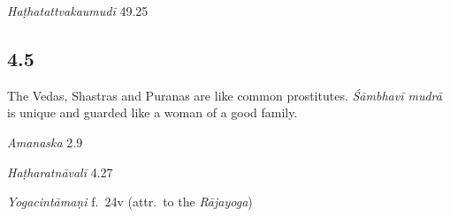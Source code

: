 \begin{ekdosis}
\begin{testimonia}[hp04_004]
\emph{Haṭhatattvakaumudī} 49.25
\begin{versinnote}
\end{versinnote}
\end{testimonia}


\subsection*{4.5}
\begin{translation}[hp04_005]
The Vedas, Shastras and Puranas are like common prostitutes. \emph{Śāmbhavī mudrā} is unique and guarded like a woman of a good family.
\end{translation}

\begin{sources}[hp04_005]
\emph{Amanaska} 2.9
\begin{versinnote}
\end{versinnote}
\end{sources}

\begin{testimonia}[hp04_005]
\emph{Haṭharatnāvalī} 4.27
\begin{versinnote}
\end{versinnote}

\emph{Yogacintāmaṇi} f.~24v (attr.~to the \textit{Rājayoga})
\begin{versinnote}
\end{versinnote}


\end{testimonia}
\end{ekdosis}
